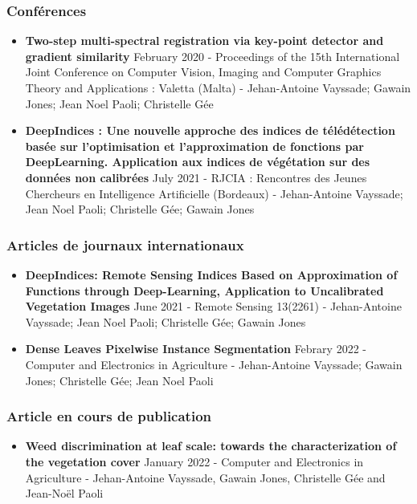 \documentclass[12pt, a4paper, twoside]{scrbook}
\begin{document}
	\subsubsection*{Conférences}
	
	\begin{itemize}
		\item \textbf{Two-step multi-spectral registration via key-point detector and gradient similarity} February 2020 - Proceedings of the 15th International Joint Conference on Computer Vision, Imaging and Computer Graphics Theory and Applications : Valetta (Malta) - Jehan-Antoine Vayssade; Gawain Jones; Jean Noel Paoli; Christelle Gée
		\item \textbf{DeepIndices : Une nouvelle approche des indices de télédétection basée sur l'optimisation et l'approximation de fonctions par DeepLearning. Application aux indices de végétation sur des données non calibrées} July 2021 - RJCIA : Rencontres des Jeunes Chercheurs en Intelligence Artificielle (Bordeaux) - Jehan-Antoine Vayssade; Jean Noel Paoli; Christelle Gée; Gawain Jones
	\end{itemize}

	\subsubsection*{Articles de journaux internationaux}
	\begin{itemize}
		\item \textbf{DeepIndices: Remote Sensing Indices Based on Approximation of Functions through Deep-Learning, Application to Uncalibrated Vegetation Images} June 2021 - Remote Sensing 13(2261) - Jehan-Antoine Vayssade; Jean Noel Paoli; Christelle Gée; Gawain Jones
        \item \textbf{Dense Leaves Pixelwise Instance Segmentation} Febrary 2022 - Computer and Electronics in Agriculture - Jehan-Antoine Vayssade; Gawain Jones; Christelle Gée; Jean Noel Paoli
	\end{itemize}

	\subsubsection*{Article en cours de publication}
	\begin{itemize}
		\item \textbf{Weed discrimination at leaf scale: towards the characterization of the vegetation  cover} January 2022 - Computer and Electronics in Agriculture - Jehan-Antoine Vayssade, Gawain Jones, Christelle Gée and Jean-Noël Paoli
	\end{itemize}
\end{document}
